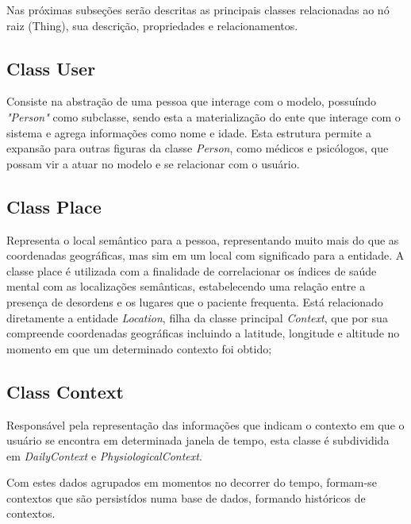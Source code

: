 \documentclass[12pt]{article}
\begin{document}
Nas próximas subseções serão descritas as principais classes relacionadas ao nó raiz (Thing), sua descrição, propriedades e relacionamentos.

\subsection{Class User} \label{sec:userClass}
Consiste na abstração de uma pessoa que interage com o modelo, possuíndo \textit{"Person"} como subclasse, sendo esta a materialização do ente que interage com o sistema e agrega informações como nome e idade.
Esta estrutura permite a expansão para outras figuras da classe \textit{Person}, como médicos e psicólogos, que possam vir a atuar no modelo e se relacionar com o usuário.

\subsection{Class Place} \label{sec:}
Representa o local semântico para a pessoa, representando muito mais do que as coordenadas geográficas, mas sim em um local com significado para a entidade. A classe place é utilizada com a finalidade de correlacionar os índices de saúde mental com as localizações semânticas, estabelecendo uma relação entre a presença de desordens e os lugares que o paciente frequenta.
Está relacionado diretamente a entidade \textit{Location}, filha da classe principal \textit{Context}, que por sua compreende coordenadas geográficas incluindo a latitude, longitude e altitude no momento em que um determinado contexto foi obtido;

\subsection{Class Context}

Responsável pela representação das informações que indicam o contexto em que o usuário se encontra em determinada janela de tempo, esta classe é subdividida em \textit{DailyContext} e \textit{PhysiologicalContext}.

Com estes dados agrupados em momentos no decorrer do tempo, formam-se contextos \cite{dey2001conceptual} que são persistídos numa base de dados, formando históricos de contextos.
\end{document}
